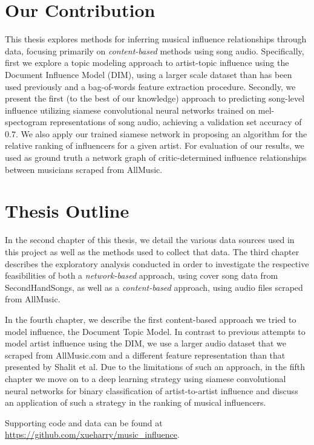 \section{Our Contribution}
This thesis explores methods for inferring musical influence relationships through data, focusing primarily on \textit{content-based} methods using song audio. Specifically, first we explore a topic modeling approach to artist-topic influence using the Document Influence Model (DIM), using a larger scale dataset than has been used previously and a bag-of-words feature extraction procedure. Secondly, we present the first (to the best of our knowledge) approach to predicting song-level influence utilizing siamese convolutional neural networks trained on mel-spectogram representations of song audio, achieving a validation set accuracy of $0.7$. We also apply our trained siamese network in proposing an algorithm for the relative ranking of influencers for a given artist. For evaluation of our results, we used as ground truth a network graph of critic-determined influence relationships between musicians scraped from AllMusic.

\section{Thesis Outline}
In the second chapter of this thesis, we detail the various data sources used in this project as well as the methods used to collect that data. The third chapter describes the exploratory analysis conducted in order to investigate the respective feasibilities of both a \textit{network-based} approach, using cover song data from SecondHandSongs, as well as a \textit{content-based} approach, using audio files scraped from AllMusic.

In the fourth chapter, we describe the first content-based approach we tried to model influence, the Document Topic Model. In contrast to previous attempts \cite{shalit2013modeling} to model artist influence using the DIM, we use a larger audio dataset that we scraped from AllMusic.com and a different feature representation than that presented by Shalit et al. Due to the limitations of such an approach, in the fifth chapter we move on to a deep learning strategy using siamese convolutional neural networks for binary classification of artist-to-artist influence and discuss an application of such a strategy in the ranking of musical influencers. 

Supporting code and data can be found at \url{https://github.com/xueharry/music_influence}.
